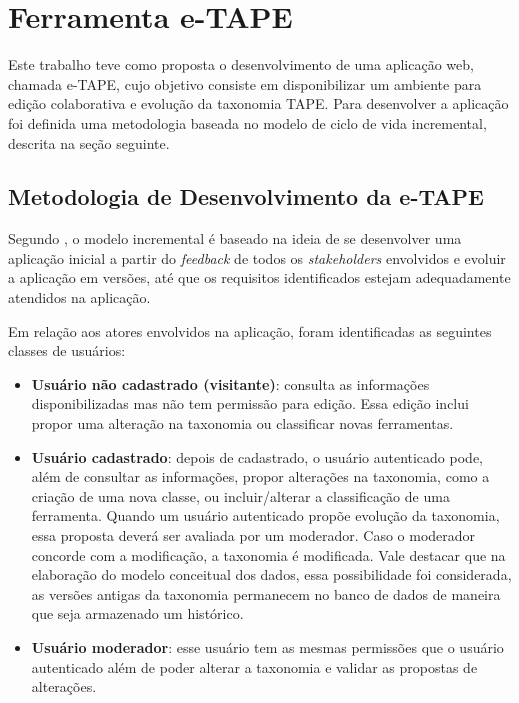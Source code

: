 \chapter[Ferramenta]{Ferramenta e-TAPE}
\label{cap:cap3}
Este trabalho teve como proposta o desenvolvimento de uma aplicação web, chamada e-TAPE, cujo objetivo consiste em disponibilizar um ambiente para edição colaborativa e evolução da taxonomia TAPE.
Para desenvolver a aplicação foi definida uma metodologia baseada no modelo de ciclo de vida incremental, descrita na seção seguinte.

\section {Metodologia de Desenvolvimento da e-TAPE}
\label{sec:desenvolvimento}
\par
Segundo , o modelo incremental é baseado na ideia de se desenvolver uma aplicação inicial a partir do \textit{feedback} de todos os \textit{stakeholders} envolvidos e evoluir a aplicação em versões, até que os requisitos identificados estejam adequadamente atendidos na aplicação. 

\par
Em relação aos atores envolvidos na aplicação, foram identificadas as seguintes classes de usuários:
\begin{itemize}
    \item \textbf{Usuário não cadastrado (visitante)}: consulta as informações disponibilizadas mas não tem permissão para edição. Essa edição inclui propor uma alteração na taxonomia ou classificar novas ferramentas.
    \item \textbf{Usuário cadastrado}: depois de cadastrado, o usuário autenticado pode, além de consultar as informações, propor alterações na taxonomia,  como a criação de uma nova classe, ou incluir/alterar a
    classificação de uma ferramenta. Quando um usuário autenticado propõe evolução da taxonomia, essa proposta deverá ser avaliada por um moderador. Caso o moderador concorde com a modificação,  a taxonomia é modificada. Vale destacar que na elaboração do modelo conceitual dos dados, essa possibilidade foi considerada, as versões antigas da taxonomia permanecem no banco de dados de maneira que seja armazenado
    um histórico. 
    \item \textbf{Usuário moderador}: esse usuário tem as mesmas permissões que o usuário autenticado além de poder alterar a taxonomia e validar as propostas de alterações. 
\end{itemize}

